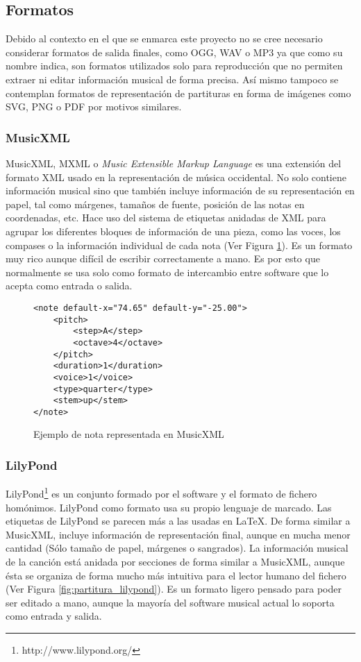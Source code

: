 \subsection{Formatos}
\label{subsec:formats}
Debido al contexto en el que se enmarca este proyecto no se cree necesario considerar formatos de salida finales, como OGG, WAV o MP3 ya que como su nombre indica, son formatos utilizados solo para reproducción que no permiten extraer ni editar información musical de forma precisa. Así mismo tampoco se contemplan formatos de representación de partituras en forma de imágenes como SVG, PNG o PDF por motivos similares.

\subsubsection{MusicXML}
MusicXML, MXML o \textit{Music Extensible Markup Language} es una extensión del formato XML usado en la representación de música occidental. No solo contiene información musical sino que también incluye información de su representación en papel, tal como márgenes, tamaños de fuente, posición de las notas en coordenadas, etc. Hace uso del sistema de etiquetas anidadas de XML para agrupar los diferentes bloques de información de una pieza, como las voces, los compases o la información individual de cada nota (Ver Figura \ref{fig:nota_musicxml}). Es un formato muy rico aunque difícil de escribir correctamente a mano. Es por esto que normalmente se usa solo como formato de intercambio entre software que lo acepta como entrada o salida.

\begin{figure}[h!]
	\centering
	\begin{Verbatim}[frame=single]
<note default-x="74.65" default-y="-25.00">
	<pitch>
		<step>A</step>
		<octave>4</octave>
	</pitch>
	<duration>1</duration>
	<voice>1</voice>
	<type>quarter</type>
	<stem>up</stem>
</note>
	\end{Verbatim}
	\caption{Ejemplo de nota representada en MusicXML}
	\label{fig:nota_musicxml}
\end{figure}


\subsubsection{LilyPond}
LilyPond\footnote{http://www.lilypond.org/} es un conjunto formado por el software y el formato de fichero homónimos. LilyPond como formato usa su propio lenguaje de marcado. Las etiquetas de LilyPond se parecen más a las usadas en \LaTeX. De forma similar a MusicXML, incluye información de representación final, aunque en mucha menor cantidad (Sólo tamaño de papel, márgenes o sangrados). La información musical de la canción está anidada por secciones de forma similar a MusicXML, aunque ésta se organiza de forma mucho más intuitiva para el lector humano del fichero (Ver Figura \ref{fig:partitura_lilypond}). Es un formato ligero pensado para poder ser editado a mano, aunque la mayoría del software musical actual lo soporta como entrada y salida. 

